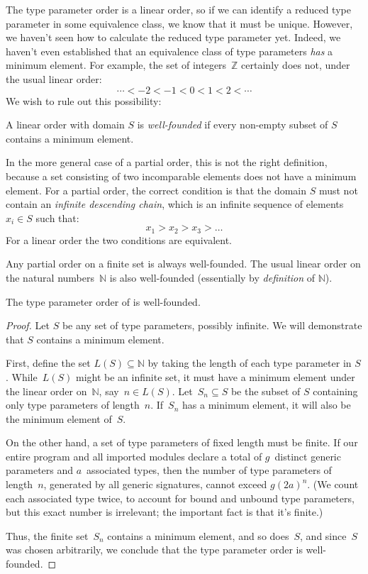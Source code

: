 \documentclass[../generics]{subfiles}
\begin{document}
The type parameter order is a linear order, so if we can identify a reduced type parameter in some equivalence class, we know that it must be unique. However, we haven't seen how to calculate the reduced type parameter yet. Indeed, we haven't even established that an equivalence class of type parameters \emph{has} a minimum element. For example, the set of integers~$\mathbb{Z}$ certainly does not, under the usual linear order:
\[\cdots < -2 < -1 < 0 < 1 < 2 < \cdots\]
We wish to rule out this possibility:
\begin{definition}
A linear order with domain $S$ is \emph{well-founded} if every non-empty subset of $S$ contains a minimum element.

In the more general case of a partial order, this is not the right definition, because a set consisting of two incomparable elements does not have a minimum element. For a partial order, the correct condition is that the domain $S$ must not contain an \emph{infinite descending chain}, which is an infinite sequence of elements $x_i\in S$ such that:
\[x_1 > x_2 > x_3 > \ldots \]
For a linear order the two conditions are equivalent.
\end{definition}

Any partial order on a finite set is always well-founded. The usual linear order on the natural numbers~$\mathbb{N}$ is also well-founded (essentially by \emph{definition} of $\mathbb{N}$).

\begin{proposition}\label{well founded type order} The type parameter order of  is well-founded.
\end{proposition}
\begin{proof}
Let $S$ be any set of type parameters, possibly infinite. We will demonstrate that $S$ contains a minimum element.

First, define the set $L(S)\subseteq\mathbb{N}$ by taking the length of each type parameter in $S$. While~$L(S)$ might be an infinite set, it must have a minimum element under the linear order on~$\mathbb{N}$, say~$n\in L(S)$. Let~$S_n\subseteq S$ be the subset of $S$ containing only type parameters of length~$n$. If~$S_n$ has a minimum element, it will also be the minimum element of~$S$.

On the other hand, a set of type parameters of fixed length must be finite. If our entire program and all imported modules declare a total of $g$~distinct generic parameters and $a$~associated types, then the number of type parameters of length~$n$, generated by all generic signatures, cannot exceed $g(2a)^n$. (We count each associated type twice, to account for bound and unbound type parameters, but this exact number is irrelevant; the important fact is that it's finite.)

Thus, the finite set~$S_n$ contains a minimum element, and so does~$S$, and since~$S$ was chosen arbitrarily, we conclude that the type parameter order is well-founded.
\end{proof}
\end{document}
